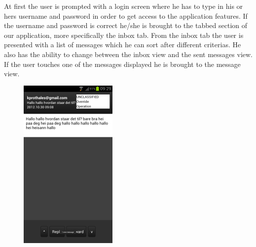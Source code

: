 At first the user is prompted with a login screen where he has to type in his or hers username and password in order to get access to the application features. If the username and password is correct he/she is brought to the tabbed section of our application, more specifically the inbox tab. From the inbox tab the user is presented with a list of messages which he can sort after different criterias. He also has the ability to change between the inbox view and the sent messages view. If the user touches one of the messages displayed he is brought to the message view.
\newline
\begin{figure}
\includegraphics{viewmessage}
\end{figure}

